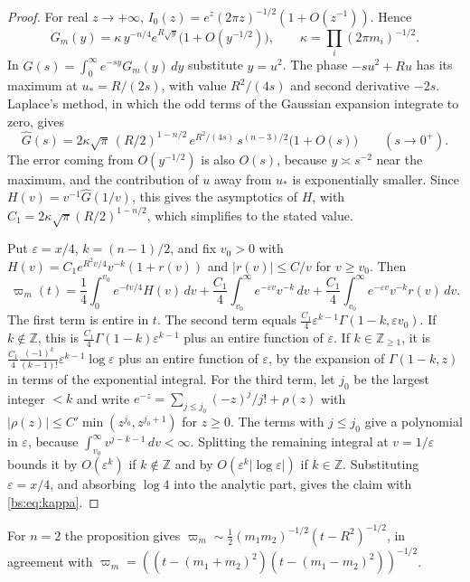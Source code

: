 \documentclass[11pt,a4paper]{article}
\theoremstyle{definition}
\theoremstyle{remark}
\numberwithin{equation}{section}
\newcommand{\Z}{\mathbb{Z}}
\begin{document}
\begin{proof}
For real $z\to+\infty$, $I_0(z)=e^z(2\pi z)^{-1/2}(1+O(z^{-1}))$. Hence
\[
G_m(y)=\kappa\,y^{-n/4}e^{R\sqrt y}\bigl(1+O(y^{-1/2})\bigr),\qquad\kappa=\prod_i(2\pi m_i)^{-1/2}.
\]
In $\widehat G(s)=\int_0^\infty e^{-sy}G_m(y)\,dy$ substitute $y=u^2$. The phase $-su^2+Ru$ has its maximum at $u_*=R/(2s)$, with value $R^2/(4s)$ and second derivative $-2s$. Laplace's method, in which the odd terms of the Gaussian expansion integrate to zero, gives
\[
\widehat G(s)=2\kappa\sqrt\pi\,(R/2)^{1-n/2}\,e^{R^2/(4s)}\,s^{(n-3)/2}\bigl(1+O(s)\bigr)\qquad(s\to0^+).
\]
The error coming from $O(y^{-1/2})$ is also $O(s)$, because $y\asymp s^{-2}$ near the maximum, and the contribution of $u$ away from $u_*$ is exponentially smaller. Since $H(v)=v^{-1}\widehat G(1/v)$, this gives the asymptotics of $H$, with $C_1=2\kappa\sqrt\pi(R/2)^{1-n/2}$, which simplifies to the stated value.

Put $\varepsilon=x/4$, $k=(n-1)/2$, and fix $v_0>0$ with $H(v)=C_1e^{R^2v/4}v^{-k}(1+r(v))$ and $|r(v)|\le C/v$ for $v\ge v_0$. Then
\[
\varpi_m(t)=\frac14\int_0^{v_0}e^{-tv/4}H(v)\,dv+\frac{C_1}4\int_{v_0}^\infty e^{-\varepsilon v}v^{-k}\,dv+\frac{C_1}4\int_{v_0}^\infty e^{-\varepsilon v}v^{-k}r(v)\,dv .
\]
The first term is entire in $t$. The second term equals $\frac{C_1}4\varepsilon^{k-1}\Gamma(1-k,\varepsilon v_0)$. If $k\notin\Z$, this is $\frac{C_1}4\Gamma(1-k)\varepsilon^{k-1}$ plus an entire function of $\varepsilon$. If $k\in\Z_{\ge1}$, it is $\frac{C_1}4\frac{(-1)^k}{(k-1)!}\varepsilon^{k-1}\log\varepsilon$ plus an entire function of $\varepsilon$, by the expansion of $\Gamma(1-k,z)$ in terms of the exponential integral. For the third term, let $j_0$ be the largest integer $<k$ and write $e^{-z}=\sum_{j\le j_0}(-z)^j/j!+\rho(z)$ with $|\rho(z)|\le C'\min(z^{j_0},z^{j_0+1})$ for $z\ge0$. The terms with $j\le j_0$ give a polynomial in $\varepsilon$, because $\int_{v_0}^\infty v^{j-k-1}\,dv<\infty$. Splitting the remaining integral at $v=1/\varepsilon$ bounds it by $O(\varepsilon^k)$ if $k\notin\Z$ and by $O(\varepsilon^k|\log\varepsilon|)$ if $k\in\Z$. Substituting $\varepsilon=x/4$, and absorbing $\log4$ into the analytic part, gives the claim with \eqref{bs:eq:kappa}.
\end{proof}

For $n=2$ the proposition gives $\varpi_m\sim\frac12(m_1m_2)^{-1/2}(t-R^2)^{-1/2}$, in agreement with $\varpi_m=((t-(m_1+m_2)^2)(t-(m_1-m_2)^2))^{-1/2}$.
\end{document}
